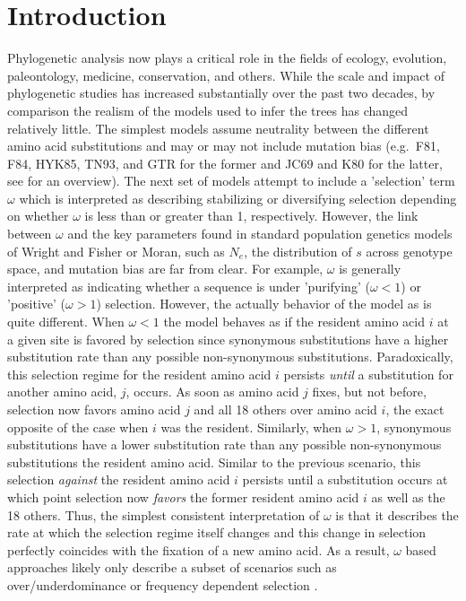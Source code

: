 \documentclass{article}
\newcommand{\Ne}{\ensuremath{{N_e}}\xspace} %
\begin{document}
\section*{Introduction}
Phylogenetic analysis now plays a critical role in the fields of ecology, evolution, paleontology, medicine, conservation, and others.
While the scale and impact of phylogenetic studies has increased substantially over the past two decades, by comparison the realism of the models used to infer the trees has changed relatively little.
The simplest models assume neutrality between the different amino acid substitutions and may or may not include mutation bias (e.g.~F81, F84, HYK85, TN93, and GTR for the former and JC69 and K80 for the latter, see \citet{Yang2014} for an overview).
The next set of models attempt to include a 'selection' term $\omega$ which is interpreted as describing stabilizing or diversifying selection depending on whether $\omega$ is less than or greater than 1, respectively. 
However, the link between $\omega$ and the key parameters found in standard population genetics models of Wright and Fisher or Moran, such as \Ne, the distribution of $s$ across genotype space, and mutation bias are far from clear.
For example,  $\omega$ is generally interpreted as indicating whether a sequence is under 'purifying' ($\omega < 1$) or 'positive' ($\omega > 1$) selection.
However, the actually behavior of the model as is quite different.
When $\omega < 1$ the model behaves as if the resident amino acid $i$ at a given site is favored by selection since synonymous substitutions have a higher substitution rate than any possible non-synonymous substitutions.
Paradoxically, this selection regime for the resident amino acid $i$ persists \emph{until} a substitution for another amino acid, $j$, occurs.
As soon as amino acid $j$ fixes, but not before, selection now favors amino acid $j$ and all 18 others over amino acid $i$, the exact opposite of the case when $i$ was the resident.
Similarly, when $\omega > 1$, synonymous substitutions have a lower substitution rate than any possible non-synonymous substitutions the resident amino acid.
Similar to the previous scenario, this selection \emph{against} the resident amino acid $i$ persists until a substitution occurs at which point selection now \emph{favors}  the former resident amino acid $i$ as well as the 18 others.
Thus, the simplest consistent interpretation of $\omega$ is that it describes the rate at which the selection regime itself changes and this change in selection perfectly coincides with the fixation of a new amino acid.
As a result, $\omega$ based approaches likely only describe a subset of scenarios such as over/underdominance or frequency dependent selection  \citep{HughesAndNei1988}.
\end{document}

